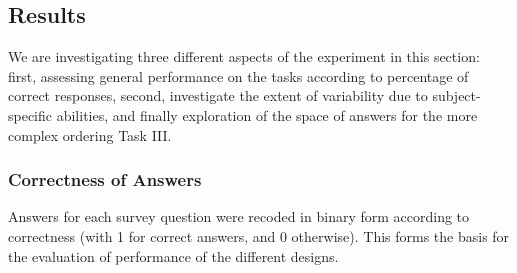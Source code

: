 \subsection{Results}\label{results}
We are investigating three different aspects  of the experiment in this section: first,  assessing general performance on the tasks according to percentage of correct responses, second, investigate the extent of variability due to subject-specific abilities, and finally exploration of the space of answers for the more complex ordering Task III.
\subsubsection*{Correctness of Answers}
Answers for each survey question  were recoded in binary form according to correctness (with 1 for correct answers, and 0 otherwise). This forms the basis for the evaluation of performance of the different designs.





